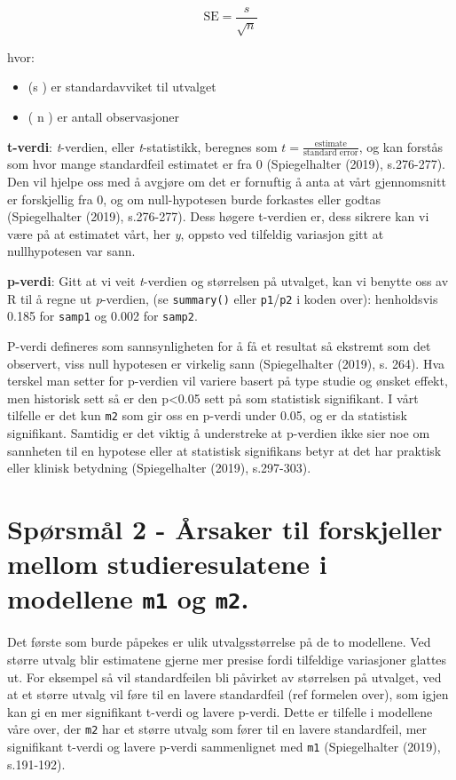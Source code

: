 \documentclass[
  letterpaper,
  DIV=11,
  numbers=noendperiod]{scrreprt}
\providecommand{\tightlist}{%
  \setlength{\itemsep}{0pt}\setlength{\parskip}{0pt}}\usepackage{longtable,booktabs,array}
\begin{document}
\[
\text{SE} = \frac{s}{\sqrt{n}}
\]

hvor:

\begin{itemize}
\tightlist
\item
  (s ) er standardavviket til utvalget
\item
  ( n ) er antall observasjoner
\end{itemize}

\textbf{t-verdi}: \emph{t}-verdien, eller \emph{t}-statistikk, beregnes
som \(t = \frac{\text{estimate}}{\text{standard error}}\), og kan
forstås som hvor mange standardfeil estimatet er fra 0 (Spiegelhalter
(2019), s.276-277). Den vil hjelpe oss med å avgjøre om det er fornuftig
å anta at vårt gjennomsnitt er forskjellig fra 0, og om null-hypotesen
burde forkastes eller godtas (Spiegelhalter (2019), s.276-277). Dess
høgere t-verdien er, dess sikrere kan vi være på at estimatet vårt, her
\emph{y}, oppsto ved tilfeldig variasjon gitt at nullhypotesen var sann.

\textbf{p-verdi}: Gitt at vi veit \emph{t}-verdien og størrelsen på
utvalget, kan vi benytte oss av R til å regne ut \emph{p}-verdien, (se
\texttt{summary()} eller \texttt{p1}/\texttt{p2} i koden over):
henholdsvis 0.185 for \texttt{samp1} og 0.002 for \texttt{samp2}.

P-verdi defineres som sannsynligheten for å få et resultat så ekstremt
som det observert, viss null hypotesen er virkelig sann (Spiegelhalter
(2019), s. 264). Hva terskel man setter for p-verdien vil variere basert
på type studie og ønsket effekt, men historisk sett så er den
p\textless0.05 sett på som statistisk signifikant. I vårt tilfelle er
det kun \texttt{m2} som gir oss en p-verdi under 0.05, og er da
statistisk signifikant. Samtidig er det viktig å understreke at
p-verdien ikke sier noe om sannheten til en hypotese eller at statistisk
signifikans betyr at det har praktisk eller klinisk betydning
(Spiegelhalter (2019), s.297-303).

\section{\texorpdfstring{Spørsmål 2 - Årsaker til forskjeller mellom
studieresulatene i modellene \texttt{m1} og
\texttt{m2}.}{Spørsmål 2 - Årsaker til forskjeller mellom studieresulatene i modellene m1 og m2.}}\label{spuxf8rsmuxe5l-2---uxe5rsaker-til-forskjeller-mellom-studieresulatene-i-modellene-m1-og-m2.}

Det første som burde påpekes er ulik utvalgsstørrelse på de to
modellene. Ved større utvalg blir estimatene gjerne mer presise fordi
tilfeldige variasjoner glattes ut. For eksempel så vil standardfeilen
bli påvirket av størrelsen på utvalget, ved at et større utvalg vil føre
til en lavere standardfeil (ref formelen over), som igjen kan gi en mer
signifikant t-verdi og lavere p-verdi. Dette er tilfelle i modellene
våre over, der \texttt{m2} har et større utvalg som fører til en lavere
standardfeil, mer signifikant t-verdi og lavere p-verdi sammenlignet med
\texttt{m1} (Spiegelhalter (2019), s.191-192).
\end{document}
